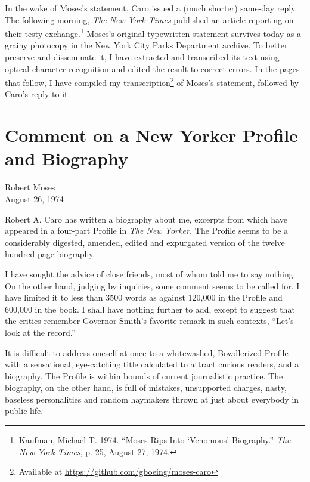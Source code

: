 \documentclass[11pt,letterpaper]{article}
\begin{document}
In the wake of Moses's statement, Caro issued a (much shorter) same-day reply. The following morning, \textit{The New York Times} published an article reporting on their testy exchange.\footnote{Kaufman, Michael T. 1974. \enquote{Moses Rips Into \enquote{Venomous} Biography.} \textit{The New York Times}, p. 25, August 27, 1974.} Moses's original typewritten statement survives today as a grainy photocopy in the New York City Parks Department archive. To better preserve and disseminate it, I have extracted and transcribed its text using optical character recognition and edited the result to correct errors. In the pages that follow, I have compiled my transcription\footnote{Available at \href{https://github.com/gboeing/moses-caro}{https://github.com/gboeing/moses-caro}} of Moses's statement, followed by Caro's reply to it.

\newpage

\section*{Comment on a New Yorker Profile and Biography}

\noindent Robert Moses\\
\noindent August 26, 1974\\
\vspace{1cm}

\noindent Robert A. Caro has written a biography about me, excerpts from which have appeared in a four-part Profile in \textit{The New Yorker.} The Profile seems to be a considerably digested, amended, edited and expurgated version of the twelve hundred page biography.

I have sought the advice of close friends, most of whom told me to say nothing. On the other hand, judging by inquiries, some comment seems to be called for. I have limited it to less than 3500 words as against 120,000 in the Profile and 600,000 in the book. I shall have nothing further to add, except to suggest that the critics remember Governor Smith's favorite remark in such contexts, \enquote{Let's look at the record.}

It is difficult to address oneself at once to a whitewashed, Bowdlerized Profile with a sensational, eye-catching title calculated to attract curious readers, and a biography. The Profile is within bounds of current journalistic practice. The biography, on the other hand, is full of mistakes, unsupported charges, nasty, baseless personalities and random haymakers thrown at just about everybody in public life.
\end{document}
